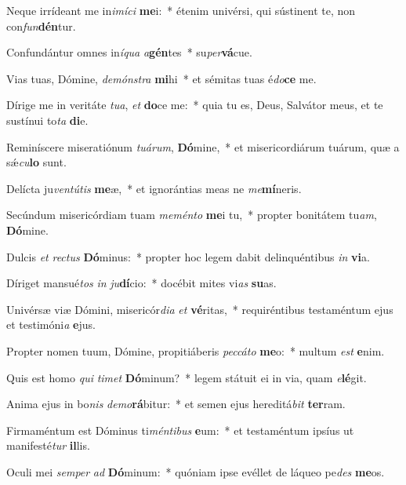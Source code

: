 \item Neque irrídeant me in\textit{i}\textit{mí}\textit{ci} \textbf{me}i:~* étenim univérsi, qui sústinent te, non con\textit{fun}\textbf{dén}tur.
\item Confundántur omnes in\textit{í}\textit{qua} \textit{a}\textbf{gén}tes~* su\textit{per}\textbf{vá}cue.
\item Vias tuas, Dómine, \textit{de}\textit{móns}\textit{tra} \textbf{mi}hi~* et sémitas tuas é\textit{do}\textbf{ce} me.
\item Dírige me in veritáte \textit{tu}\textit{a}, \textit{et} \textbf{do}ce me:~* quia tu es, Deus, Salvátor meus, et te sustínui to\textit{ta} \textbf{di}e.
\item Reminíscere miseratiónum \textit{tu}\textit{á}\textit{rum}, \textbf{Dó}mine,~* et misericordiárum tuárum, quæ a sǽ\textit{cu}\textbf{lo} sunt.
\item Delícta ju\textit{ven}\textit{tú}\textit{tis} \textbf{me}æ,~* et ignorántias meas ne \textit{me}\textbf{mí}neris.
\item Secúndum misericórdiam tuam \textit{me}\textit{mén}\textit{to} \textbf{me}i tu,~* propter bonitátem tu\textit{am}, \textbf{Dó}mine.
\item Dulcis \textit{et} \textit{rec}\textit{tus} \textbf{Dó}minus:~* propter hoc legem dabit delinquéntibus \textit{in} \textbf{vi}a.
\item Díriget mansué\textit{tos} \textit{in} \textit{ju}\textbf{dí}cio:~* docébit mites vi\textit{as} \textbf{su}as.
\item Univérsæ viæ Dómini, misericór\textit{di}\textit{a} \textit{et} \textbf{vé}ritas,~* requiréntibus testaméntum ejus et testimóni\textit{a} \textbf{e}jus.
\item Propter nomen tuum, Dómine, propitiáberis \textit{pec}\textit{cá}\textit{to} \textbf{me}o:~* multum \textit{est} \textbf{e}nim.
\item Quis est homo \textit{qui} \textit{ti}\textit{met} \textbf{Dó}minum?~* legem státuit ei in via, quam \textit{e}\textbf{lé}git.
\item Anima ejus in bo\textit{nis} \textit{de}\textit{mo}\textbf{rá}bitur:~* et semen ejus hereditá\textit{bit} \textbf{ter}ram.
\item Firmaméntum est Dóminus ti\textit{mén}\textit{ti}\textit{bus} \textbf{e}um:~* et testaméntum ipsíus ut manifesté\textit{tur} \textbf{il}lis.
\item Oculi mei \textit{sem}\textit{per} \textit{ad} \textbf{Dó}minum:~* quóniam ipse evéllet de láqueo pe\textit{des} \textbf{me}os.
